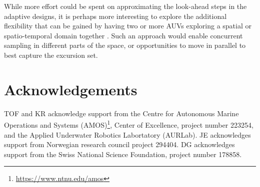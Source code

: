 \documentclass[aoas]{imsart}
\begin{document}
While more effort could be spent on approximating the look-ahead steps in the adaptive designs, it is perhaps more interesting to explore the additional flexibility that can be gained by having two or more AUVs  exploring a spatial or spatio-temporal domain together \citep{ferreira2019advancing}. Such an approach would enable concurrent sampling in  different parts of the space, or opportunities to move in parallel to best capture the excursion set.

\section*{Acknowledgements}
TOF and KR acknowledge support from the Centre for Autonomous Marine Operations and Systems (AMOS)\footnote{\url{https://www.ntnu.edu/amos}}, Center of Excellence, project number 223254, and the Applied Underwater Robotics Labortatory (AURLab). JE acknowledges support from Norwegian research council project 294404. DG acknowledges support from the Swiss National Science Foundation, project number 178858.


\footnotesize



\end{document}
